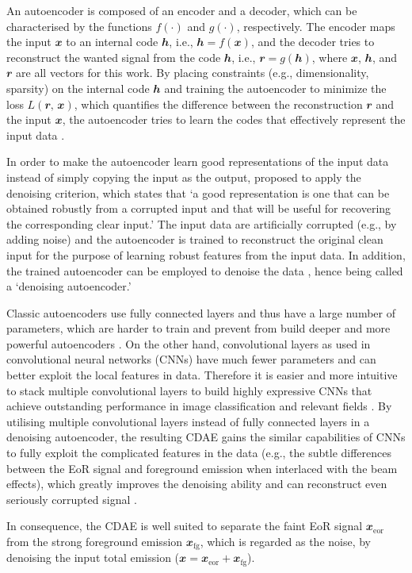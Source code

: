 \documentclass[fleqn,usenatbib]{mnras}
\newcommand{\R}[1]{\mathrm{#1}}
\newcommand{\B}[1]{\mathbfit{#1}}
\newcommand{\editwip}[1]{{\leavevmode\color{magenta}#1}}
\begin{document}
An autoencoder is composed of an encoder and a decoder, which can be
characterised by the functions $f(\cdot)$ and $g(\cdot)$, respectively.
The encoder maps the input $\B{x}$ to an internal code $\B{h}$, i.e.,
$\B{h} = f(\B{x})$, and the decoder tries to reconstruct the wanted
signal from the code $\B{h}$, i.e., $\B{r} = g(\B{h})$, where $\B{x}$,
$\B{h}$, and $\B{r}$ are all vectors for this work.
By placing constraints (e.g., dimensionality, sparsity) on the
internal code $\B{h}$ and training the autoencoder to minimize the
loss $L(\B{r}, \, \B{x})$, which quantifies the difference between the
reconstruction $\B{r}$ and the input $\B{x}$, the autoencoder tries to
learn the codes that effectively represent the input data
\citep[e.g.,][chapter 14]{goodfellow2016}.

\editwip{%
In order to make the autoencoder learn good representations of the input
data instead of simply copying the input as the output,
\citet{vincent2008,vincent2010} proposed to apply the denoising criterion,
which states that `a good representation is one that can be obtained
robustly from a corrupted input and that will be useful for recovering the
corresponding clear input.'
The input data are artificially corrupted (e.g., by adding noise) and the
autoencoder is trained to reconstruct the original clean input for the
purpose of learning robust features from the input data.
In addition, the trained autoencoder can be employed to denoise the data
\citep[e.g.,][]{xie2012,gondara2016}, hence being called a `denoising
autoencoder.'

Classic autoencoders use fully connected layers and thus have a large
number of parameters, which are harder to train and prevent from build
deeper and more powerful autoencoders
\citep[e.g.,][]{glorot2010,larochelle2009}.
On the other hand, convolutional layers as used in convolutional neural
networks (CNNs) have much fewer parameters and can better exploit the local
features in data.  Therefore it is easier and more intuitive to stack
multiple convolutional layers to build highly expressive CNNs that achieve
outstanding performance in image classification and relevant fields
\citep[e.g.,][]{krizhevsky2012,simonyan2014,szegedy2015}.
By utilising multiple convolutional layers instead of fully connected
layers in a denoising autoencoder, the resulting CDAE gains the similar
capabilities of CNNs to fully exploit the complicated features in the data
(e.g., the subtle differences between the EoR signal and foreground
emission when interlaced with the beam effects), which greatly improves
the denoising ability and can reconstruct even seriously corrupted signal
\citep{du2017}.}  %
In consequence, the CDAE is well suited to separate the faint EoR signal
$\B{x}_{\R{eor}}$ from the strong foreground emission $\B{x}_{\R{fg}}$,
which is regarded as the noise, by denoising the input total emission
($\B{x} = \B{x}_{\R{eor}} + \B{x}_{\R{fg}}$).
\end{document}
